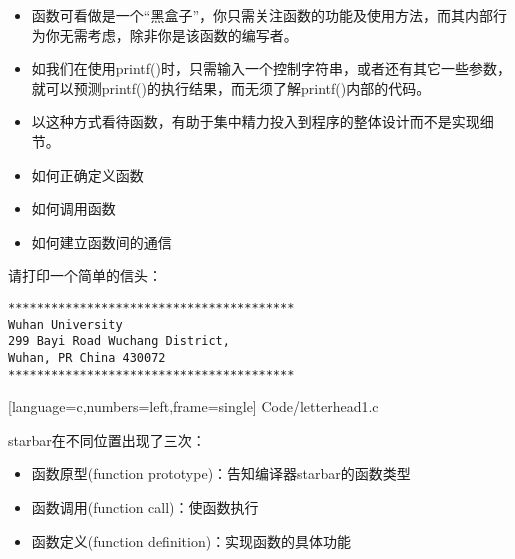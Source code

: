 \begin{frame}[fragile]
\begin{itemize}
\item
函数可看做是一个“黑盒子”，你只需关注函数的功能及使用方法，而其内部行为你无需考虑，除非你是该函数的编写者。\\[0.1in]
\item
如我们在使用{\tf printf()}时，只需输入一个控制字符串，或者还有其它一些参数，就可以预测{\tf printf()}的执行结果，而无须了解{\tf printf()}内部的代码。
\\[0.1in]
\item
以这种方式看待函数，有助于集中精力投入到程序的整体设计而不是实现细节。
\end{itemize}
\end{frame}

\begin{frame}[fragile]
\begin{itemize}
\item 如何正确定义函数\\[0.1in]
\item 如何调用函数\\[0.1in]
\item 如何建立函数间的通信
\end{itemize}

\end{frame}

\begin{frame}[fragile]
请打印一个简单的信头：
\begin{lstlisting}[backgroundcolor=\color{red!10}]
****************************************
Wuhan University
299 Bayi Road Wuchang District,
Wuhan, PR China 430072
****************************************
\end{lstlisting}
\end{frame}

\begin{frame}

[language=c,numbers=left,frame=single]
{Code/letterhead1.c}
\end{frame}


\begin{frame}[fragile]
{\tf starbar}在不同位置出现了三次：\vspace{0.1in}

\begin{itemize}
\item 函数原型{\tf (function prototype)}：告知编译器starbar的函数类型\\[0.1in]
\item 函数调用{\tf (function call)}：使函数执行\\[0.1in]
\item 函数定义{\tf (function definition)}：实现函数的具体功能
\end{itemize}
\end{frame}

